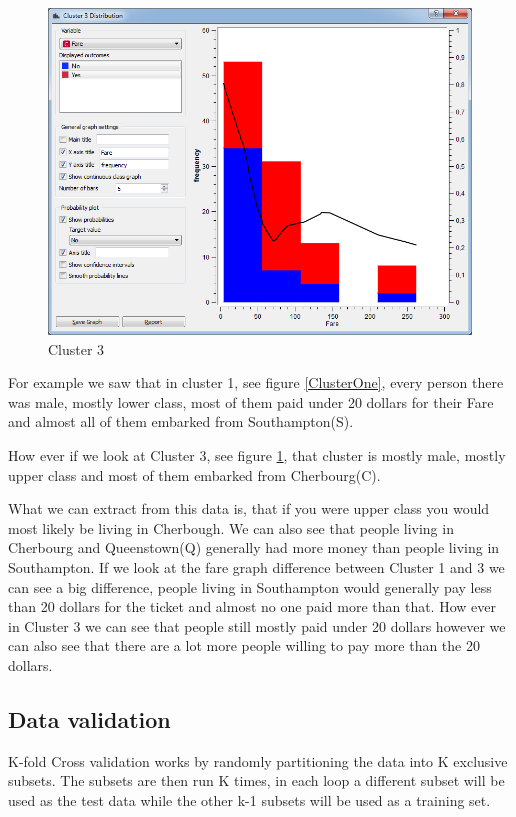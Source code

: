 \documentclass[a4paper,11pt]{article}
\begin{document}
\begin{figure}[h]
\begin{center}
		\includegraphics[scale=0.30]{ClusterDistribution/Cluster3/Fare}
	\end{center}
	\caption{Cluster 3}
	\label{ClusterThree}
\end{figure}


For example we saw that in cluster 1, see figure \ref{ClusterOne}, every person there was male, mostly lower class, most of them paid under 20 dollars for their Fare and almost all of them embarked from Southampton(S).

How ever if we look at Cluster 3, see figure \ref{ClusterThree}, that cluster is mostly male, mostly upper class and most of them embarked from Cherbourg(C).

What we can extract from this data is, that if you were upper class you would most likely be living in Cherbough.
We can also see that people living in Cherbourg and Queenstown(Q) generally had more money than people living in Southampton. If we look at the fare graph difference between Cluster 1 and 3 we can see a big difference, people living in Southampton would generally pay less than 20 dollars for the ticket and almost no one paid more than that. How ever in Cluster 3 we can see that people still mostly paid under 20 dollars however we can also see that there are a lot more people willing to pay more than the 20 dollars.




\subsection{Data validation}
K-fold Cross validation \cite[p.370]{DataMinBook} works by randomly partitioning the data into K exclusive subsets. The subsets are then run K times, in each loop a different subset will be used as the test data while the other k-1 subsets will be used as a training set.
\end{document}
